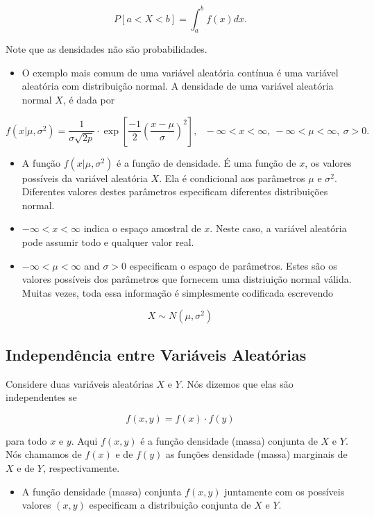 \documentclass[]{article}
\providecommand{\tightlist}{%
  \setlength{\itemsep}{0pt}\setlength{\parskip}{0pt}}
\begin{document}
\[ P[a < X < b] = \int_{a}^{b} f(x)dx. \]

Note que as densidades não são probabilidades.

\begin{itemize}
\tightlist
\item
  O exemplo mais comum de uma variável aleatória contínua é uma variável
  aleatória com distribuição normal. A densidade de uma variável
  aleatória normal \(X\), é dada por
\end{itemize}

\[ f(x | \mu, \sigma^2) = \frac{1}{\sigma\sqrt{2p}} \cdot \exp\left[\frac{-1}{2} \left(\frac{x - \mu}{\sigma}\right)^2 \right], \ \ \ -\infty < x < \infty, \ -\infty < \mu < \infty, \ \sigma > 0. \]

\begin{itemize}
\tightlist
\item
  A função \(f(x | \mu, \sigma^2)\) é a função de densidade. É uma
  função de \(x\), os valores possíveis da variável aleatória \(X\). Ela
  é condicional aos parâmetros \(\mu\) e \(\sigma^2\). Diferentes
  valores destes parâmetros especificam diferentes distribuições normal.
\item
  \(-\infty < x < \infty\) indica o espaço amostral de \(x\). Neste
  caso, a variável aleatória pode assumir todo e qualquer valor real.
\item
  \(-\infty < \mu < \infty\) and \(\sigma > 0\) especificam o espaço de
  parâmetros. Estes são os valores possíveis dos parâmetros que fornecem
  uma distriuição normal válida. Muitas vezes, toda essa informação é
  simplesmente codificada escrevendo
\end{itemize}

\[ X \sim N(\mu, \sigma^2) \]

\subsection{Independência entre Variáveis
Aleatórias}\label{independencia-entre-variaveis-aleatorias}

Considere duas variáveis aleatórias \(X\) e \(Y\). Nós dizemos que elas
são independentes se

\[ f(x, y) = f(x) \cdot f(y) \]

para todo \(x\) e \(y\). Aqui \(f(x, y)\) é a função densidade (massa)
conjunta de \(X\) e \(Y\). Nós chamamos de \(f(x)\) e de \(f(y)\) as
funções densidade (massa) marginais de \(X\) e de \(Y\),
respectivamente.

\begin{itemize}
\tightlist
\item
  A função densidade (massa) conjunta \(f(x, y)\) juntamente com os
  possíveis valores \((x, y)\) especificam a distribuição conjunta de
  \(X\) e \(Y\).
\end{itemize}
\end{document}
